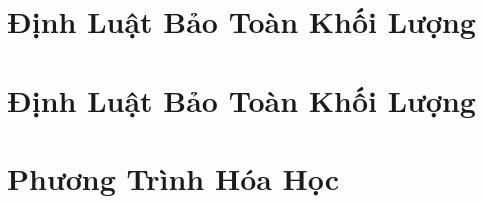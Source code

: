 \documentclass{article}
\numberwithin{equation}{section}
\begin{document}
\section{Định Luật Bảo Toàn Khối Lượng}


\section{Định Luật Bảo Toàn Khối Lượng}


\section{Phương Trình Hóa Học}


\printbibliography[heading=bibintoc]
	
\end{document}
